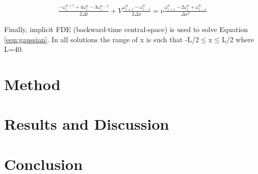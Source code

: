 \documentclass[letterpaper,12pt]{article}
\begin{document}
\begin{eqnarray}
\frac{-\omega^{n+1}_{i}+4\omega^{n}_{i}-3\omega^{n-1}_{i}}{2\Delta t} + V\frac{\omega^{n}_{i+1}-\omega^{n}_{i-1}}{2\Delta x} = \nu\frac{\omega^{n}_{i+1}-2\omega^{n}_{i}+\omega^{n}_{i-1}}{\Delta x^2}
\end{eqnarray}

Finally, implicit FDE (backward-time central-space) is used to solve Equation \ref{eqn:gaussian}.
In all solutions the range of x is such that -L/2$\leq$x$\leq$L/2 where L=40.


\section{Method}

\section{Results and Discussion}

\section{Conclusion}
\end{document}
